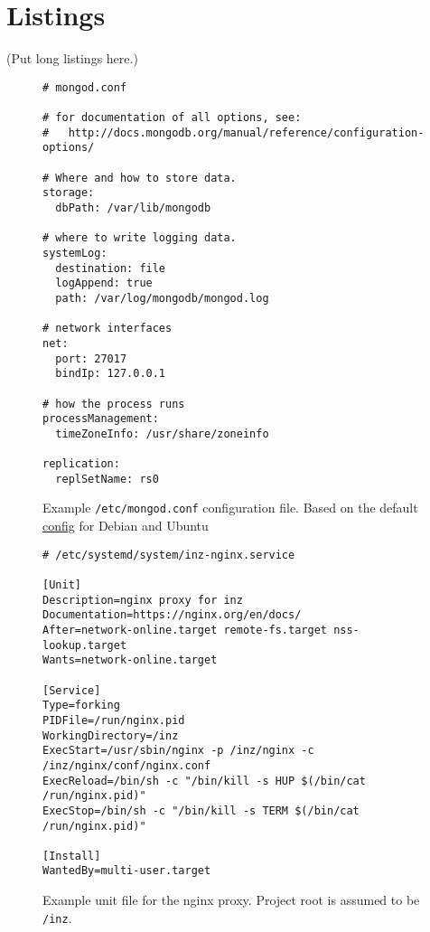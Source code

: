 \chapter{Listings}

(Put long listings here.)
\begin{figure}
	\centering
	\begin{verbatim}
# mongod.conf

# for documentation of all options, see:
#   http://docs.mongodb.org/manual/reference/configuration-options/

# Where and how to store data.
storage:
  dbPath: /var/lib/mongodb

# where to write logging data.
systemLog:
  destination: file
  logAppend: true
  path: /var/log/mongodb/mongod.log

# network interfaces
net:
  port: 27017
  bindIp: 127.0.0.1

# how the process runs
processManagement:
  timeZoneInfo: /usr/share/zoneinfo

replication:
  replSetName: rs0
	\end{verbatim}
	\caption{Example \texttt{/etc/mongod.conf} configuration file. Based on the default \href{https://github.com/mongodb/mongo/blob/e4fff3e1fe7b31b25cedde7b05205325b47b4a7d/debian/mongod.conf}{config} for Debian and Ubuntu}
	\label{fig:example-mongod}
\end{figure}

\begin{figure}
	\centering
	\begin{verbatim}
# /etc/systemd/system/inz-nginx.service

[Unit]
Description=nginx proxy for inz
Documentation=https://nginx.org/en/docs/
After=network-online.target remote-fs.target nss-lookup.target
Wants=network-online.target

[Service]
Type=forking
PIDFile=/run/nginx.pid
WorkingDirectory=/inz
ExecStart=/usr/sbin/nginx -p /inz/nginx -c /inz/nginx/conf/nginx.conf
ExecReload=/bin/sh -c "/bin/kill -s HUP $(/bin/cat /run/nginx.pid)"
ExecStop=/bin/sh -c "/bin/kill -s TERM $(/bin/cat /run/nginx.pid)"

[Install]
WantedBy=multi-user.target
	\end{verbatim}
	\caption{Example unit file for the nginx proxy. Project root is assumed to be \texttt{/inz}.}
	\label{fig:example-nginx-service}
\end{figure}

